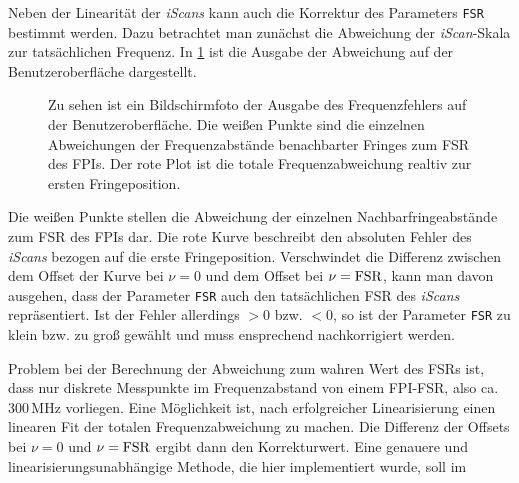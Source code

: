 Neben der Linearität der \textit{iScans} kann auch die Korrektur des Parameters
\lstinline|FSR| bestimmt werden. Dazu betrachtet man zunächst die
Abweichung der \textit{iScan}-Skala zur tatsächlichen Frequenz. In
\ref{fig:linearisierung_benutzeroberflaeche_frequenz-abweichung} ist die
Ausgabe der Abweichung auf der Benutzeroberfläche dargestellt.
\begin{figure}[h]
 	\centering
	\caption[Benutzeroberfläche Linearisierung -
	Frequenzfehler]{Zu sehen ist ein Bildschirmfoto der Ausgabe	des Frequenzfehlers
	auf der Benutzeroberfläche. Die weißen Punkte sind die einzelnen Abweichungen
	der Frequenzabstände benachbarter Fringes zum FSR des FPIs. Der rote Plot ist
	die totale Frequenzabweichung realtiv zur ersten Fringeposition.}
	\label{fig:linearisierung_benutzeroberflaeche_frequenz-abweichung}
\end{figure}
Die weißen Punkte stellen die Abweichung der einzelnen Nachbarfringeabstände zum
FSR des FPIs dar. Die rote Kurve beschreibt den absoluten Fehler des
\textit{iScans} bezogen auf die erste Fringeposition. Verschwindet die
Differenz zwischen dem Offset der Kurve bei $\nu=0$ und dem Offset bei
$\nu=\text{\lstinline|FSR|}$, kann man davon ausgehen, dass der Parameter
\lstinline|FSR| auch den tatsächlichen FSR des \textit{iScans} repräsentiert.
Ist der Fehler allerdings $>0$ bzw. $<0$, so
ist der Parameter \lstinline|FSR| zu klein bzw. zu groß gewählt und muss
ensprechend nachkorrigiert werden.\par
Problem bei der Berechnung der Abweichung
zum wahren Wert des FSRs ist, dass nur diskrete Messpunkte im Frequenzabstand
von einem FPI-FSR, also ca. $300\,$MHz vorliegen. Eine Möglichkeit ist, nach
erfolgreicher Linearisierung einen linearen Fit der totalen Frequenzabweichung
zu machen. Die Differenz der Offsets bei $\nu=0$ und
$\nu=\text{\lstinline|FSR|}$ ergibt dann den Korrekturwert. Eine genauere und
linearisierungsunabhängige Methode, die hier implementiert wurde, soll im
